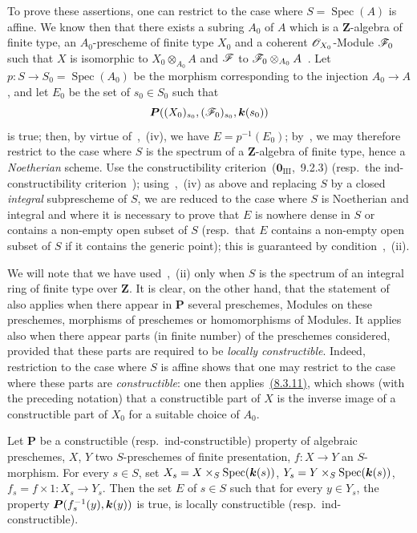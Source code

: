 To prove these assertions, one can restrict to the case where $S=\operatorname{Spec}(A)$ is affine.
We know then that there exists a subring $A_0$ of $A$ which is a $\mathbf{Z}$-algebra of finite type, an $A_0$-prescheme of finite type $X_0$ and a coherent $\mathscr{O}_{X_0}$-Module $\mathscr{F}_0$ such that $X$ is isomorphic to $X_0\otimes_{A_0}A$ and $\mathscr{F}$ to $\mathscr{F}_0\otimes_{A_0}A$~.
Let $p:S\to S_0=\operatorname{Spec}(A_0)$ be the morphism corresponding to the injection $A_0\to A$, and let $E_0$ be the set of $s_0\in S_0$ such that
\[
  \boldsymbol{P}((X_0)_{s_0},(\mathscr{F}_0)_{s_0},\boldsymbol{k}(s_0))
\]
is true; then, by virtue of~,~(iv), we have $E=p^{-1}(E_0)$; by~, we may therefore restrict to the case where $S$ is the spectrum of a $\mathbf{Z}$-algebra of finite type, hence a \emph{Noetherian} scheme.
Use the constructibility criterion~($\mathbf{0}_{\mathrm{III}}$,~9.2.3) (resp.\ the ind-constructibility criterion~); using~,~(iv) as above and replacing $S$ by a closed \emph{integral} subprescheme of $S$, we are reduced to the case where $S$ is Noetherian and integral and where it is necessary to prove that $E$ is nowhere dense in $S$ or contains a non-empty open subset of $S$ (resp.\ that $E$ contains a non-empty open subset of $S$ if it contains the generic point); this is guaranteed by condition~,~(ii).

We will note that we have used~,~(ii) only when $S$ is the spectrum of an integral ring of finite type over $\mathbf{Z}$.
It is clear, on the other hand, that the statement of~ also applies when there appear in $\boldsymbol{P}$ several preschemes, Modules on these preschemes, morphisms of preschemes or homomorphisms of Modules.
It applies also when there appear parts (in finite number) of the preschemes considered, provided that these parts are required to be \emph{locally constructible}.
Indeed, restriction to the case where $S$ is affine shows that one may restrict to the case where these parts are \emph{constructible}: one then applies~{\hyperref[IV.8.3.11]{(8.3.11)}}, which shows (with the preceding notation) that a constructible part of $X$ is the inverse image of a constructible part of $X_0$ for a suitable choice of $A_0$.

\begin{corollary}[9.2.4]
\label{IV.9.2.4}
Let $\boldsymbol{P}$ be a constructible \textnormal{(resp.}\ ind-constructible\textnormal{)} property of algebraic preschemes, $X$, $Y$ two $S$-preschemes of finite presentation, $f:X\to Y$ an $S$-morphism.
For every $s\in S$, set $X_s=X\times_S\operatorname{Spec}(\boldsymbol{k}(s))$, $Y_s=Y\times_S\operatorname{Spec}(\boldsymbol{k}(s))$, $f_s=f\times 1:X_s\to Y_s$.
Then the set $E$ of $s\in S$ such that for every $y\in Y_s$, the property $\boldsymbol{P}(f_s^{-1}(y),\boldsymbol{k}(y))$ is true, is locally constructible \textnormal{(resp.}\ ind-constructible\textnormal{)}.
\end{corollary}

